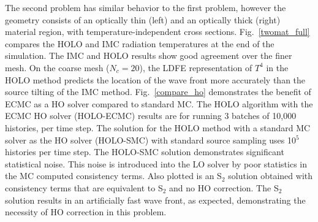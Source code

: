 \documentclass[11pt]{article}
\begin{document}
The second problem has similar behavior to the first problem, however the geometry consists of an optically thin (left) and an optically thick (right) material region,
with temperature-independent cross sections.  Fig.~\ref{twomat_full} compares the HOLO and IMC radiation 
temperatures at the end of the simulation. The
IMC and HOLO results show good agreement
over the finer mesh.
On the coarse mesh ($N_c=20$), the LDFE representation of $T^4$ in the HOLO method predicts the location of the
wave front more accurately than the source tilting of the IMC method.
Fig.~\ref{compare_ho} demonstrates the benefit of ECMC as a HO solver compared to
standard MC.  The HOLO algorithm
with the ECMC HO solver (HOLO-ECMC) results
are for running 3 batches of 10,000 histories, per time step. The solution for the HOLO method with a standard MC solver as the HO solver
(HOLO-SMC) with standard source sampling uses 10$^5$ histories per time step. The HOLO-SMC solution demonstrates significant
statistical noise.  This noise is introduced into the LO solver by poor statistics in
the MC computed consistency terms. Also
plotted is an S$_2$ solution obtained with consistency terms that are equivalent
to S$_2$ and no HO correction.  The S$_2$ solution results in an artificially fast
wave front, as expected, demonstrating the necessity of HO correction in this problem.
\end{document}

